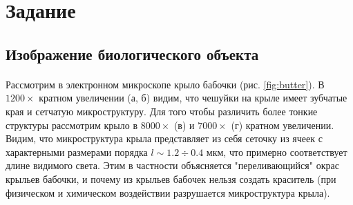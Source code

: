 \documentclass[a4paper,12pt]{article} %
\begin{document}
\section{Задание}

\subsection{Изображение биологического объекта}

\paragraph{} Рассмотрим в электронном микроскопе крыло бабочки (рис. \ref{fig:butter}). В $1200\times$ кратном увеличении (а, б) видим, что чешуйки на крыле имеет зубчатые края и сетчатую микроструктуру. Для того чтобы различить более тонкие структуры рассмотрим крыло в $8000\times$ (в) и $7000\times$ (г) кратном увеличении. Видим, что микроструктура крыла представляет из себя сеточку из ячеек с характерными размерами порядка $l \sim 1.2\div0.4$ мкм, что примерно соответствует длине видимого света. Этим в частности объясняется "переливающийся" окрас крыльев бабочки, и почему из крыльев бабочек нельзя создать краситель (при физическом и химическом воздействии разрушается микроструктура крыла).
\end{document}

